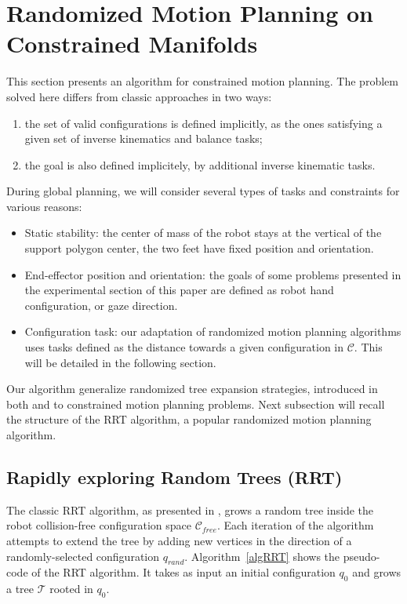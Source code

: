 \documentclass{article}
\begin{document}
\section{Randomized Motion Planning on Constrained Manifolds}
\label{sec:wb}

This section presents an algorithm for constrained motion planning. 
The problem solved here
differs from classic approaches in two ways:
\begin{enumerate}
\item the set of valid configurations is defined implicitly, as the ones satisfying a given 
  set of inverse kinematics and balance tasks;
\item the goal is also defined implicitely, by additional inverse kinematic tasks.
\end{enumerate}
During global planning, we will consider several types of
tasks and constraints for various reasons:
\begin{itemize}
\item  Static stability: the center of mass of the robot stays at
  the vertical of the support polygon center, the two feet have fixed position and
  orientation.
\item End-effector position and orientation: the goals of some problems presented
  in the experimental section of this paper are defined as robot hand configuration,
  or gaze direction.
\item Configuration task: our adaptation of randomized motion planning algorithms 
  uses tasks defined as the distance towards a given configuration in $\mathcal{C}$. 
  This will be detailed in the following section.
\end{itemize}


Our algorithm generalize randomized tree expansion strategies, introduced in both \cite{HsuLat99c} and
\cite{kuffner00rrtconnect} to constrained motion planning problems. Next subsection will recall the structure of the RRT algorithm,
a popular randomized motion planning algorithm.


\subsection{Rapidly exploring Random Trees (RRT)}

The classic RRT algorithm, as presented in  \cite{kuffner00rrtconnect}, grows 
a random tree inside the robot 
collision-free configuration space 
$\mathcal{C}_{free}$. Each iteration of the algorithm attempts to extend the tree
by adding new vertices in the direction of a randomly-selected configuration
$q_{rand}$. Algorithm~\ref{algRRT} shows the pseudo-code of the RRT algorithm.
It takes as input an initial configuration $q_0$ and grows a tree  $\mathcal{T}$ rooted 
in $q_0$. 
\end{document}
